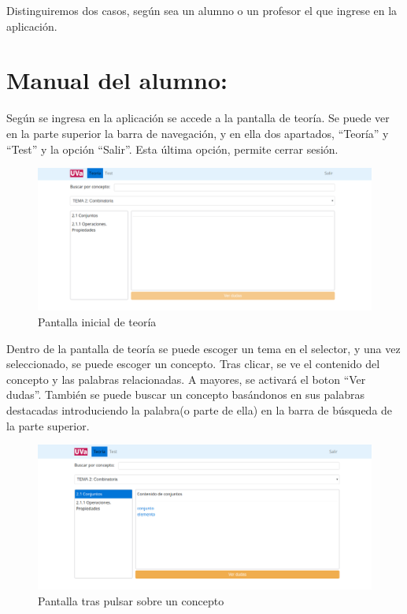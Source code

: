 \documentclass[openright,twoside,10pt]{book}
\begin{document}
    Distinguiremos dos casos, según sea un alumno o un profesor el que
    ingrese en la aplicación.
    
    \newpage
    
    \section{Manual del alumno:}\label{manual-del-alumno}
    
    Según se ingresa en la aplicación se accede a la pantalla de teoría. Se
    puede ver en la parte superior la barra de navegación, y en ella dos
    apartados, \enquote{Teoría} y \enquote{Test} y la opción
    \enquote{Salir}. Esta última opción, permite cerrar sesión.
    
    \begin{figure}[H]
        \begin{center}
            \includegraphics[width=\textwidth]{img/manual/alumno-teoria.png}
        \end{center}
        \caption{Pantalla inicial de teoría}
    \end{figure}
    
    Dentro de la pantalla de teoría se puede escoger un tema en el selector,
    y una vez seleccionado, se puede escoger un concepto. Tras clicar, se ve
    el contenido del concepto y las palabras relacionadas. A mayores, se
    activará el boton \enquote{Ver dudas}. También se puede buscar un
    concepto basándonos en sus palabras destacadas introduciendo la
    palabra(o parte de ella) en la barra de búsqueda de la parte superior.
    
    \begin{figure}[H]
        \begin{center}
            \includegraphics[width=\textwidth]{img/manual/alumno-teoria2.png}
        \end{center}
        \caption{Pantalla tras pulsar sobre un concepto}
    \end{figure}
    
\end{document}
